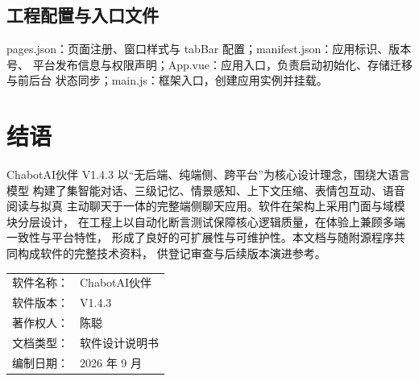 \documentclass[zihao=5,a4paper]{ctexart}
\begin{document}
\subsection{工程配置与入口文件}
pages.json：页面注册、窗口样式与 tabBar 配置；manifest.json：应用标识、版本号、
平台发布信息与权限声明；App.vue：应用入口，负责启动初始化、存储迁移与前后台
状态同步；main.js：框架入口，创建应用实例并挂载。

\section{结语}
ChabotAI伙伴 V1.4.3 以“无后端、纯端侧、跨平台”为核心设计理念，围绕大语言模型
构建了集智能对话、三级记忆、情景感知、上下文压缩、表情包互动、语音阅读与拟真
主动聊天于一体的完整端侧聊天应用。软件在架构上采用门面与域模块分层设计，
在工程上以自动化断言测试保障核心逻辑质量，在体验上兼顾多端一致性与平台特性，
形成了良好的可扩展性与可维护性。本文档与随附源程序共同构成软件的完整技术资料，
供登记审查与后续版本演进参考。

\vspace{1em}
\noindent
\begin{tabular}{@{}ll@{}}
  软件名称： & ChabotAI伙伴 \\
  软件版本： & V1.4.3 \\
  著作权人： & 陈聪 \\
  文档类型： & 软件设计说明书 \\
  编制日期： & 2026 年 9 月 \\
\end{tabular}
\end{document}

